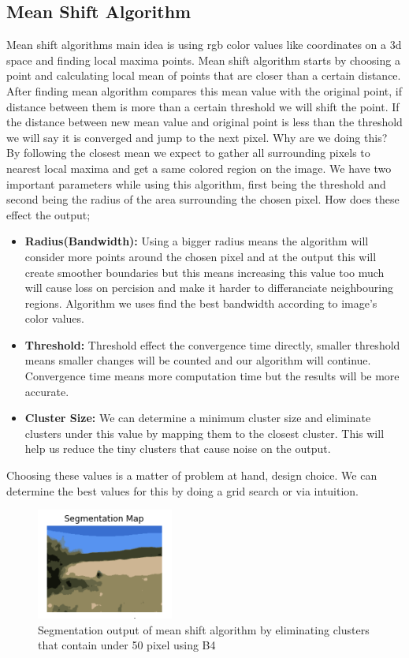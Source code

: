 \documentclass[conference]{IEEEtran}
\begin{document}
\subsection{Mean Shift Algorithm}
Mean shift algorithms main idea is using rgb color values like coordinates on a 3d space and finding local maxima points. Mean shift algorithm starts by choosing a point and calculating local mean of points that are closer than a certain distance. After finding mean algorithm compares this mean value with the original point, if distance between them is more than a certain threshold we will shift the point. If the distance between new mean value and original point is less than the threshold we will say it is converged and jump to the next pixel. Why are we doing this? By following the closest mean we expect to gather all surrounding pixels to nearest local maxima and get a same colored region on the image. We have two important parameters while using this algorithm, first being the threshold and second being the radius of the area surrounding the chosen pixel. How does these effect the output;
\begin{itemize}
\item \textbf{Radius(Bandwidth):} Using a bigger radius means the algorithm will consider more points around the chosen pixel and at the output this will create smoother boundaries but this means increasing this value too much will cause loss on percision and make it harder to differanciate neighbouring regions. Algorithm we uses find the best bandwidth according to image's color values.
\item \textbf{Threshold:} Threshold effect the convergence time directly, smaller threshold means smaller changes will be counted and our algorithm will continue. Convergence time means more computation time but the results will be more accurate. 
\item \textbf{Cluster Size:} We can determine a minimum cluster size and eliminate clusters under this value by mapping them to the closest cluster. This will help us reduce the tiny clusters that cause noise on the output. 
\end{itemize}

Choosing these values is a matter of problem at hand, design choice. We can determine the best values for this by doing a grid search or via intuition. 

\begin{figure}[h]
        \centering
        \includegraphics[width=0.4\textwidth]{resources/1_s.png}
        \caption{Segmentation output of mean shift algorithm by eliminating clusters that contain under 50 pixel using B4}
        \label{fig:1_s}
    \end{figure}
\end{document}
